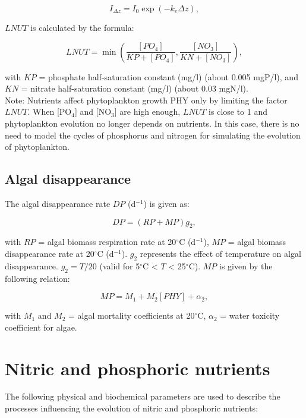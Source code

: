 \begin{equation}
  I_{\Delta z} = I_0 \exp (-k_e \Delta z),
\end{equation}


$LNUT$ is calculated by the formula:

\begin{equation}
  LNUT = \min \left( \frac{[PO_4]}{KP+[PO_4]}, \frac{[NO_3]}{KN+[NO_3]} \right),
\end{equation}

with $KP$ = phosphate half-saturation constant (mg/l) (about 0.005 mgP/l),
and $KN$ = nitrate half-saturation constant (mg/l) (about 0.03 mgN/l).\\

Note: Nutrients affect phytoplankton growth PHY only by limiting the factor $LNUT$.
When [PO$_4$] and [NO$_3$] are high enough, $LNUT$ is close to 1 and
phytoplankton evolution no longer depends on nutrients.
In this case, there is no need to model the cycles of phosphorus and nitrogen
for simulating the evolution of phytoplankton.

\subsection{Algal disappearance}

The algal disappearance rate $DP$ (d$^{-1}$) is given as:

\begin{equation}
  DP = (RP+MP) g_2,
\end{equation}

with $RP$ = algal biomass respiration rate at 20$^{\circ}$C (d$^{-1}$),
$MP$ = algal biomass disappearance rate at 20$^{\circ}$C (d$^{-1}$).
$g_2$ represents the effect of temperature on algal disappearance.
$g_2 = T/20$ (valid for 5$^{\circ}$C < $T$ < 25$^{\circ}$C).
$MP$ is given by the following relation:

\begin{equation}
  MP = M_1 + M_2 [PHY] + \alpha_2,
\end{equation}

with $M_1$ and $M_2$ = algal mortality coefficients at 20$^{\circ}$C,
$\alpha_2$ = water toxicity coefficient for algae.

\section{Nitric and phosphoric nutrients}

The following physical and biochemical parameters are used
to describe the processes influencing the evolution of nitric and phosphoric nutrients:


